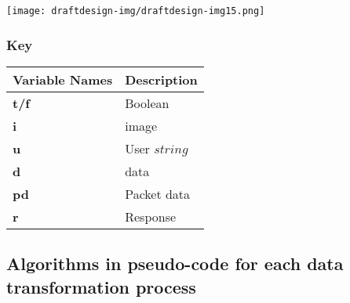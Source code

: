 \documentclass[12pt,a4paper]{report}
\begin{document}
\texttt{[image: draftdesign-img/draftdesign-img15.png]}

\subsubsection[Key]{Key}


\begin{tabular}{| m{8cm} | m{8cm} |}
\hline
\bfseries Variable Names &
\bfseries Description\\\hline
\bfseries t/f & 
Boolean\\\hline
\bfseries i & 
image\\\hline
\bfseries u &
User \(string\)\\\hline
\bfseries d &
data\\\hline
\bfseries pd &
Packet data\\\hline
\bfseries r &
Response\\\hline
\end{tabular}


\bigskip

\subsection[Algorithms in pseudo{}-code for each data transformation process]{Algorithms in pseudo-code for each data transformation process}
\end{document}
